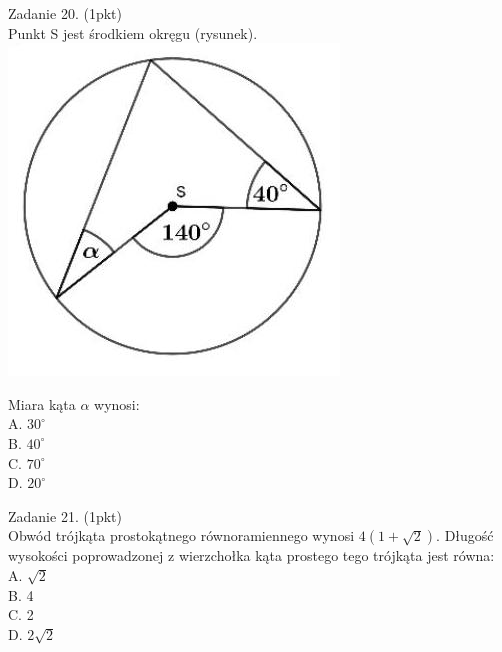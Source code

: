 \documentclass[10pt]{article}
\begin{document}
Zadanie 20. (1pkt)\\
Punkt S jest środkiem okręgu (rysunek).\\
\includegraphics[max width=\textwidth, center]{2024_11_21_23d228cacd5e4a9a3f86g-06(1)}

Miara kąta \(\alpha\) wynosi:\\
A. \(30^{\circ}\)\\
B. \(40^{\circ}\)\\
C. \(70^{\circ}\)\\
D. \(20^{\circ}\)

Zadanie 21. (1pkt)\\
Obwód trójkąta prostokątnego równoramiennego wynosi \(4(1+\sqrt{2})\). Długość wysokości poprowadzonej z wierzchołka kąta prostego tego trójkąta jest równa:\\
A. \(\sqrt{2}\)\\
B. 4\\
C. 2\\
D. \(2 \sqrt{2}\)
\end{document}
